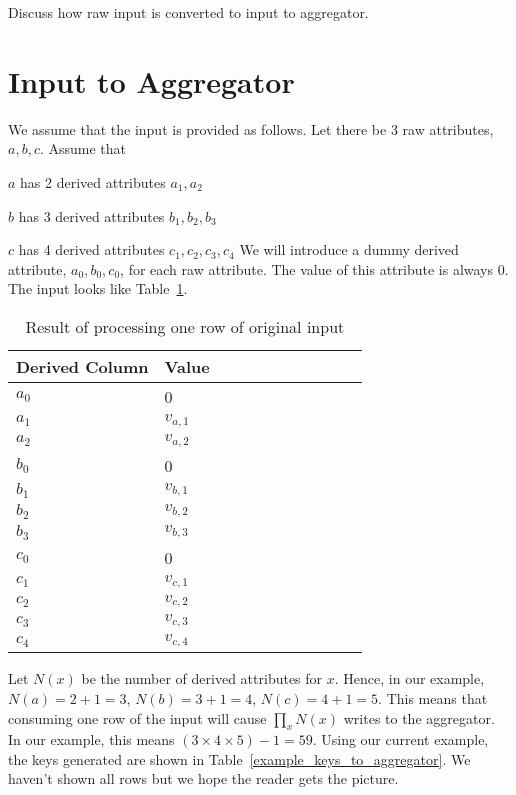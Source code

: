 Discuss how raw input is converted to input to aggregator. \TBC

\section{Input to Aggregator}

We assume that the input is provided as follows. Let there be 3 raw attributes, \(a,
b, c\). Assume that 
\be
\item \(a\) has 2 derived attributes \(a_1, a_2\)
\item \(b\) has 3 derived attributes \(b_1, b_2, b_3\)
\item \(c\) has 4 derived attributes \(c_1, c_2, c_3, c_4\)
\ee
We will introduce a dummy derived attribute, \(a_0, b_0, c_0\), for each raw
attribute. The value of this attribute is always 0.
The input looks like Table~\ref{example_input_to_agg}.

\begin{table}[hbtp]
\centering
\begin{tabular}{|l|l|l|l|l|l|l|l|l|l|l|} \hline \hline
{\bf Derived Column} & {\bf Value} \\ \hline \hline
\(a_0\) & 0 \\ \hline
\(a_1\) & \(v_{a, 1}\) \\ \hline
\(a_2\) & \(v_{a, 2}\) \\ \hline
%
\(b_0\) & 0 \\ \hline
\(b_1\) & \(v_{b, 1}\) \\ \hline
\(b_2\) & \(v_{b, 2}\) \\ \hline
\(b_3\) & \(v_{b, 3}\) \\ \hline
%
\(c_0\) & 0 \\ \hline
\(c_1\) & \(v_{c, 1}\) \\ \hline
\(c_2\) & \(v_{c, 2}\) \\ \hline
\(c_3\) & \(v_{c, 3}\) \\ \hline
\(c_4\) & \(v_{c, 4}\) \\ \hline
%
\end{tabular}
\caption{Result of processing one row of original input}
\label{example_input_to_agg}
\end{table}

Let \(N(x) \) be the number of derived attributes for \(x\).
Hence, in our example, \(N(a) = 2+1 = 3\), \(N(b) = 3+1 = 4\), \(N(c) = 4+1 = 5\). 
This means that consuming one row of the input will cause \(\prod_x N(x)\) writes to the
aggregator. In our example, this means \((3 \times 4 \times 5) -1 = 59\). 
Using our current example, the keys generated 
are shown in Table~\ref{example_keys_to_aggregator}. We haven't shown all rows
but we hope the reader gets the picture. 

